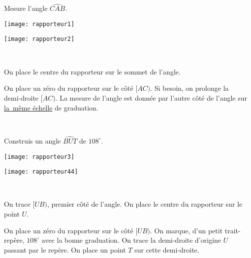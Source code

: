 \begin{methode*1}

\begin{exemple*1}
Mesure l'angle $\widehat{CAB}$. \\[0.75em]

\begin{minipage}[c]{0.49\textwidth}
\centering
\texttt{[image: rapporteur1]}
\end{minipage}\hfill%
 \begin{minipage}[c]{0.49\textwidth}%
 \centering
 \texttt{[image: rapporteur2]}
  \end{minipage} \\
 \begin{minipage}[c]{0.43\textwidth}
On place le centre du rapporteur sur le sommet de l'angle.
\end{minipage} \hfill%
 \begin{minipage}[c]{0.53\textwidth}
 On place un zéro du rapporteur sur le côté $[AC)$. Si besoin, on prolonge la demi‑droite $[AC)$. La mesure de l'angle est donnée par l'autre côté de l'angle sur \underline{la même échelle} de graduation.
 \end{minipage} \\
  \end{exemple*1}
 
 \begin{exemple*1}
Construis un angle $\widehat{BUT}$ de $108^\circ$.  \\[0.75em]

\begin{minipage}[c]{0.49\textwidth}
\centering
\texttt{[image: rapporteur3]}
\end{minipage}\hfill%
 \begin{minipage}[c]{0.49\textwidth}%
 \centering
 \texttt{[image: rapporteur44]}
  \end{minipage} \\
 \begin{minipage}[c]{0.43\textwidth}
On trace $[UB)$, premier côté de l'angle. On place le centre du rapporteur sur le point $U$.
\end{minipage} \hfill%
 \begin{minipage}[c]{0.53\textwidth}
 On place un zéro du rapporteur sur le côté $[UB)$. On marque, d'un petit trait-repère, $108^\circ$ avec la bonne graduation.
On trace la demi‑droite d'origine $U$ passant par le repère. On place un point $T$ sur cette demi‑droite.
  \end{minipage} \\
  \end{exemple*1}
 

\end{methode*1}
